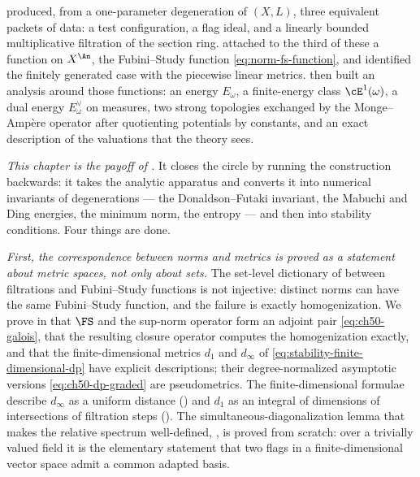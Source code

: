  produced, from a one-parameter
degeneration of $(X,L)$, three equivalent packets of data: a test
configuration, a flag ideal, and a linearly bounded multiplicative
filtration of the section ring.   attached to the
third of these a function on $X^{\An}$, the Fubini--Study function
\eqref{eq:norm-fs-function}, and identified the finitely generated case
with the piecewise linear metrics.
 then built an analysis
around those functions: an energy $E_\omega$, a finite-energy class
$\cE^1(\omega)$, a dual energy $E^\vee_\omega$ on measures, two strong
topologies exchanged by the Monge--Amp\`ere operator after quotienting
potentials by constants, and an exact
description of the valuations that the theory sees.

\emph{This chapter is the payoff of .}
It closes the circle by running the construction backwards: it takes the
analytic apparatus and converts it into numerical invariants of
degenerations --- the Donaldson--Futaki invariant, the Mabuchi and Ding
energies, the minimum norm, the entropy --- and then into stability
conditions.  Four things are done.

\emph{First, the correspondence between norms and metrics is proved as a
statement about metric spaces, not only about sets.}  The set-level
dictionary of  between filtrations and
Fubini--Study functions is not injective: distinct norms can have the same
Fubini--Study function, and the failure is exactly homogenization.  We prove
in  that $\FS$ and the sup-norm operator form an
adjoint pair \eqref{eq:ch50-galois}, that the resulting closure operator
computes the homogenization exactly, and that the
finite-dimensional metrics $d_1$ and $d_\infty$ of
\eqref{eq:stability-finite-dimensional-dp} have explicit descriptions;
their degree-normalized asymptotic versions
\eqref{eq:ch50-dp-graded} are pseudometrics.  The finite-dimensional
formulae describe $d_\infty$ as a uniform distance
() and $d_1$ as an integral of dimensions of
intersections of filtration steps ().  The
simultaneous-diagonalization lemma that makes the relative spectrum
well-defined, , is proved from scratch:
over a trivially valued field it is the elementary statement that two flags
in a finite-dimensional vector space admit a common adapted basis.

